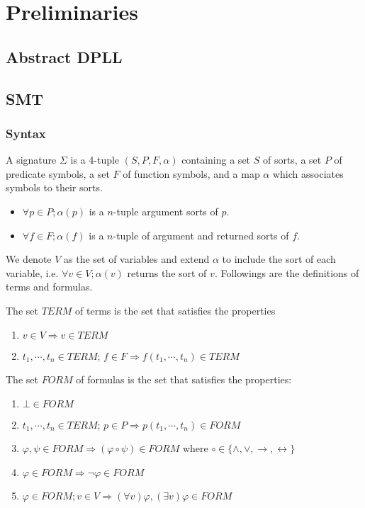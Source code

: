 \chapter{Preliminaries}
\section{Abstract DPLL}


\section{SMT}
\subsection{Syntax}
\begin{definition}
A signature $\Sigma$ is a 4-tuple $(S, P, F, \alpha)$ containing a set $S$ of sorts, a set $P$ of predicate symbols, a set $F$ of function symbols, and a map $\alpha$ which associates symbols to their sorts.
\begin{itemize}
\item $\forall p \in P; \alpha(p)$ is a $n$-tuple argument sorts of $p$.
\item $\forall f \in F; \alpha(f)$ is a $n$-tuple of argument and returned sorts of $f$.
\end{itemize}
\end{definition}


We denote $V$ as the set of variables and extend $\alpha$ to include the sort of each variable, i.e. $\forall v \in V; \alpha(v)$ returns the sort of $v$. Followings are the definitions of terms and formulas.

\begin{definition}
The set $TERM$ of terms is the set that satisfies the properties
\begin{enumerate}
\item $v \in V \Rightarrow v \in TERM$
\item $t_1,\cdots,t_n \in TERM$; $f \in F \Rightarrow f(t_1,\cdots, t_n) \in TERM$
\end{enumerate}
\end{definition}

\begin{definition}
The set $FORM$ of formulas is the set that satisfies the properties:
\begin{enumerate}
\item $\bot \in FORM$
\item $t_1,\cdots,t_n \in TERM$; $p \in P \Rightarrow p(t_1,\cdots, t_n) \in FORM$
\item $\varphi, \psi \in FORM \Rightarrow (\varphi \circ \psi) \in FORM$ where $\circ \in \{\wedge, \vee, \rightarrow, \leftrightarrow\}$
\item $\varphi \in FORM \Rightarrow \neg\varphi \in FORM$
\item $\varphi \in FORM; v \in V \Rightarrow (\forall v)\varphi, (\exists v)\varphi \in FORM$
\end{enumerate}
\end{definition}


